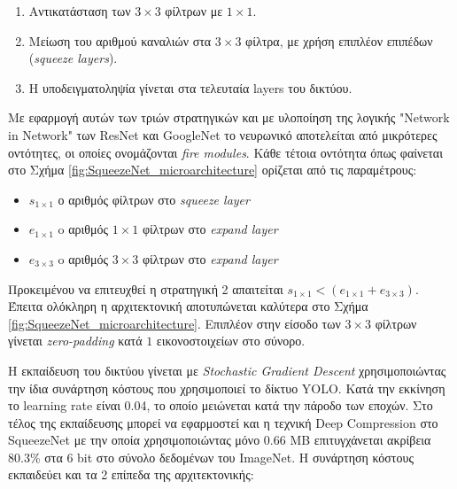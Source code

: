 \begin{enumerate}
    \item Αντικατάσταση των $3\times3$ φίλτρων με $1\times1$.
    \item Μείωση του αριθμού καναλιών στα $3\times3$ φίλτρα, με χρήση επιπλέον επιπέδων (\textit{squeeze layers}).
    \item H υποδειγματοληψία γίνεται στα τελευταία layers του δικτύου.
\end{enumerate}

Με εφαρμογή αυτών των τριών στρατηγικών και με υλοποίηση της λογικής "Network in Network"\cite{75} των ResNet \cite{21} και GoogleNet \cite{24} το νευρωνικό αποτελείται από μικρότερες οντότητες, οι οποίες ονομάζονται \textit{fire modules}. Κάθε τέτοια οντότητα όπως φαίνεται στο Σχήμα \ref{fig:SqueezeNet_microarchitecture} ορίζεται από τις παραμέτρους:
\begin{itemize}
  \setlength\itemsep{0em}
    \item {$ s_{1 \times 1} $ ο αριθμός φίλτρων στο \textit{squeeze layer}}
    \item {$ e_{1 \times 1} $ o αριθμός $ 1\times1 $ φίλτρων στο \textit{expand layer}}
    \item {$ e_{3 \times 3} $  o αριθμός $ 3\times3 $ φίλτρων στο \textit{expand layer}}
\end{itemize}

Προκειμένου να επιτευχθεί η στρατηγική 2 απαιτείται $s_{1\times1} < (e_{1\times1} + e_{3\times3})$. Έπειτα ολόκληρη η αρχιτεκτονική αποτυπώνεται καλύτερα στο Σχήμα \ref{fig:SqueezeNet_microarchitecture}. Επιπλέον %
στην είσοδο των $3\times3$ φίλτρων γίνεται \textit{zero-padding} κατά $1$ εικονοστοιχείων στο σύνορο.

Η εκπαίδευση του δικτύου γίνεται με \textit{Stochastic Gradient Descent} χρησιμοποιώντας την ίδια συνάρτηση κόστους που χρησιμοποιεί το δίκτυο YOLO\cite{6}. Κατά την εκκίνηση το learning rate είναι 0.04, το οποίο μειώνεται κατά την πάροδο των εποχών. Στο τέλος της εκπαίδευσης μπορεί να εφαρμοστεί και η τεχνική Deep Compression στο SqueezeNet με την οποία χρησιμοποιώντας μόνο 0.66 ΜΒ επιτυγχάνεται ακρίβεια 80.3\% στα 6 bit στο σύνολο δεδομένων του ImageNet. Η συνάρτηση κόστους εκπαιδεύει και τα 2 επίπεδα της αρχιτεκτονικής:


